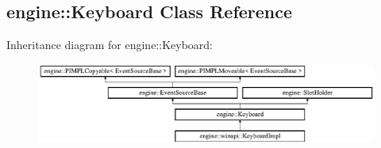 \hypertarget{a00055}{}\subsection{engine\+:\+:Keyboard Class Reference}
\label{a00055}
Inheritance diagram for engine\+:\+:Keyboard\+:\begin{figure}[H]
\begin{center}
\leavevmode
\includegraphics[height=2.647754cm]{a00055}
\end{center}
\end{figure}
